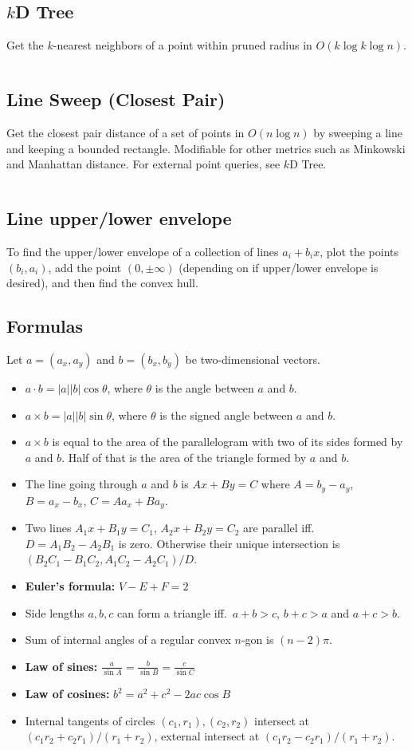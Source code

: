 \documentclass[8pt,a4paper,landscape,oneside]{amsart}
\newcommand{\code}[1]{\inputminted[fontsize=\normalsize,baselinestretch=1]{cpp}{_code/#1}}
\begin{document}
\begin{multicols*}{3}
  \subsection{$k$D Tree}
    Get the $k$-nearest neighbors of a point within pruned radius in $O(k \log k \log n)$.
    \code{geom/kd-tree.cpp}
  \subsection{Line Sweep (Closest Pair)}
    Get the closest pair distance of a set of points in $O(n \log n)$ by sweeping a line and
    keeping a bounded rectangle. Modifiable for other metrics such as Minkowski and
    Manhattan distance. For external point queries, see $k$D Tree.
    \code{geom/closest-pair.cpp}
  \subsection{Line upper/lower envelope}
    To find the upper/lower envelope of a collection of lines $a_i+b_i x$,
    plot the points $(b_i,a_i)$, add the point $(0,\pm \infty)$ (depending
    on if upper/lower envelope is desired), and then find the convex hull.
  \subsection{Formulas}
    Let $a = (a_x, a_y)$ and $b = (b_x, b_y)$ be two-dimensional vectors.
    \begin{itemize}
      \item $a\cdot b = |a||b|\cos{\theta}$, where $\theta$ is the angle
        between $a$ and $b$.
      \item $a\times b = |a||b|\sin{\theta}$, where $\theta$ is the
        signed angle between $a$ and $b$.
      \item $a\times b$ is equal to the area of the parallelogram with
        two of its sides formed by $a$ and $b$. Half of that is the
        area of the triangle formed by $a$ and $b$.
      \item The line going through $a$ and $b$ is $Ax+By=C$ where $A=b_y-a_y$, $B=a_x-b_x$, $C=Aa_x+Ba_y$.
      \item Two lines $A_1x+B_1y=C_1$, $A_2x+B_2y=C_2$ are parallel iff.\ $D=A_1B_2-A_2B_1$ is zero. Otherwise their unique intersection is $(B_2C_1-B_1C_2,A_1C_2-A_2C_1)/D$.
      \item \textbf{Euler's formula:} $V - E + F = 2$
      \item Side lengths $a,b,c$ can form a triangle iff.\ $a+b>c$, $b+c>a$ and $a+c>b$.
      \item Sum of internal angles of a regular convex $n$-gon is $(n-2)\pi$.
      \item \textbf{Law of sines:} $\frac{a}{\sin A} = \frac{b}{\sin B} = \frac{c}{\sin C}$
      \item \textbf{Law of cosines:} $b^2 = a^2 + c^2 - 2ac\cos B$
      \item Internal tangents of circles $(c_1,r_1), (c_2,r_2)$ intersect at $(c_1r_2+c_2r_1)/(r_1+r_2)$, external intersect at $(c_1r_2-c_2r_1)/(r_1+r_2)$.
    \end{itemize}

\end{multicols*}
\end{document}
